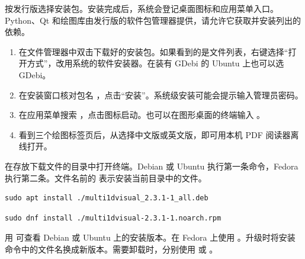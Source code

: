 按发行版选择安装包。安装完成后，系统会登记桌面图标和应用菜单入口。Python、Qt 和绘图库由发行版的软件包管理器提供，请允许它获取并安装列出的依赖。
\begin{enumerate}
\item 在文件管理器中双击下载好的安装包。如果看到的是文件列表，右键选择“打开方式”，改用系统的软件安装器。在装有 GDebi 的 Ubuntu 上也可以选 GDebi。
\item 在安装窗口核对包名 ，点击“安装”。系统级安装可能会提示输入管理员密码。
\item 在应用菜单搜索 ，点击图标启动。也可以在图形桌面的终端输入 。
\item 看到三个绘图标签页后，从选择中文版或英文版，即可用本机 PDF 阅读器离线打开。
\end{enumerate}
在存放下载文件的目录中打开终端。Debian 或 Ubuntu 执行第一条命令，Fedora 执行第二条。文件名前的  表示安装当前目录中的文件。
\begin{verbatim}
sudo apt install ./multi1dvisual_2.3.1-1_all.deb
\end{verbatim}
\begin{verbatim}
sudo dnf install ./multi1dvisual-2.3.1-1.noarch.rpm
\end{verbatim}
用  可查看 Debian 或 Ubuntu 上的安装版本。在 Fedora 上使用 。升级时将安装命令中的文件名换成新版本。需要卸载时，分别使用  或 。

